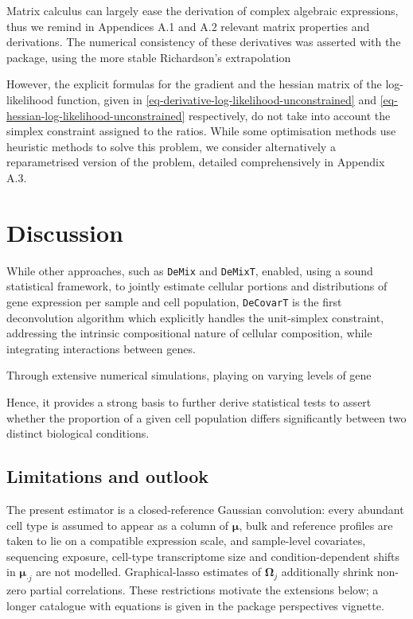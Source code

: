 \documentclass[pdflatex, sn-nature]{sn-jnl}
\theoremstyle{thmstyleone}%
\theoremstyle{thmstyletwo}%
\theoremstyle{thmstylethree}%
\begin{document}
    Matrix calculus can largely ease the derivation of complex algebraic
    expressions, thus we remind in Appendices A.1 and A.2 relevant matrix properties
    and derivations. The numerical consistency of these derivatives was asserted
    with the  package, using the more stable Richardson’s
    extrapolation

    However, the explicit formulas for the gradient and the hessian matrix of the
    log-likelihood function, given in
    \ref{eq-derivative-log-likelihood-unconstrained} and
    \ref{eq-hessian-log-likelihood-unconstrained} respectively, do not take into
    account the simplex constraint assigned to the ratios. While some
    optimisation methods use heuristic methods to solve this problem, we consider
    alternatively a reparametrised version of the problem, detailed
    comprehensively in Appendix A.3.

    \section{Discussion}

    While other approaches, such as \texttt{DeMix} and \texttt{DeMixT}, enabled,
    using a sound statistical framework, to jointly estimate cellular portions
    and distributions of gene expression per sample and cell population, \texttt{DeCovarT}
    is the first deconvolution algorithm which explicitly handles the unit-simplex
    constraint, addressing the intrinsic compositional nature of cellular composition,
    while integrating interactions between genes.

    Through extensive numerical simulations, playing on varying levels of gene

    Hence, it provides a strong basis to further derive statistical tests to assert
    whether the proportion of a given cell population differs significantly between
    two distinct biological conditions.

    \subsection{Limitations and outlook}

    The present estimator is a closed-reference Gaussian convolution: every
    abundant cell type is assumed to appear as a column of $\boldsymbol{\mu}$,
    bulk and reference profiles are taken to lie on a compatible expression
    scale, and sample-level covariates, sequencing exposure, cell-type
    transcriptome size and condition-dependent shifts in
    $\boldsymbol{\mu}_{\cdot j}$ are not modelled. Graphical-lasso estimates of
    $\boldsymbol{\Omega}_{j}$ additionally shrink non-zero partial correlations.
    These restrictions motivate the extensions below; a longer catalogue with
    equations is given in the package perspectives vignette.
\end{document}
